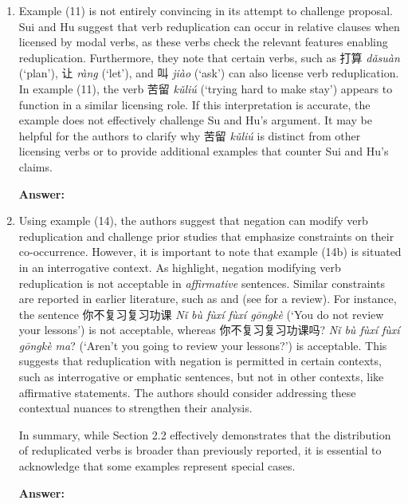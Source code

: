 \documentclass[fleqn,twoside]{article}
\begin{document}
\begin{enumerate}
    \item Example (11) is not entirely convincing in its attempt to challenge  proposal. Sui and Hu suggest that verb reduplication can occur in relative clauses when licensed by modal verbs, as these verbs check the relevant features enabling reduplication. Furthermore, they note that certain verbs, such as 打算 \textit{dǎsuàn} (`plan'), 让 \textit{ràng} (`let'), and 叫 \textit{jiào} (`ask') can also license verb
    reduplication. In example (11), the verb 苦留 \textit{kǔliú} (`trying hard to make stay')
    appears to function in a similar licensing role. If this interpretation is accurate, the example does not effectively challenge Su and Hu’s argument. It may be helpful for the authors to clarify why 苦留 \textit{kǔliú} is distinct from other licensing verbs or to provide additional examples that counter Sui and Hu's claims.
    
    \noindent
    \textbf{Answer:}
    
    \item Using example (14), the authors suggest that negation can modify verb reduplication and challenge prior studies that emphasize constraints on their co-occurrence. However, it is important to note that example (14b) is situated in an interrogative context. As \citet{SuiHu2016} highlight, negation modifying verb reduplication is not acceptable in \textit{affirmative} sentences. Similar constraints are reported in earlier literature, such as \citet{Shen1995} and \citet{Liu1983} (see \citealt{Xie2018} for a review).
    For instance, the sentence 你不复习复习功课 \textit{Nǐ bù fùxí fùxí gōngkè} (`You do not review your lessons’) is not acceptable, whereas 你不复习复习功课吗? \textit{Nǐ
    bù fùxí fùxí gōngkè ma}? (`Aren't you going to review your lessons?') is acceptable. This suggests that reduplication with negation is permitted in certain contexts, such as interrogative or emphatic sentences, but not in other contexts, like affirmative statements. The authors should consider addressing these contextual nuances to strengthen their analysis.
    
    In summary, while Section 2.2 effectively demonstrates that the distribution of reduplicated verbs is broader than previously reported, it is essential to acknowledge that some examples represent special cases.
    
    \noindent
    \textbf{Answer:}
    

\end{enumerate}
\end{document}
